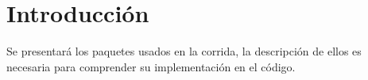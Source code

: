 \section{Introducción}

Se presentará los paquetes usados en la corrida, la descripción de ellos es necesaria para comprender su implementación en el código.

